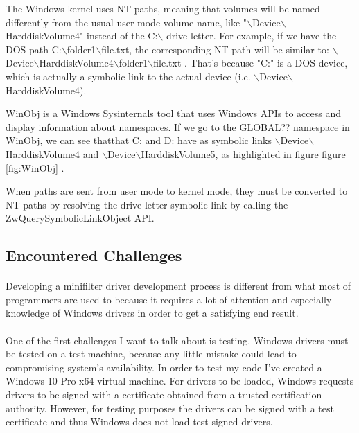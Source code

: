 		The Windows kernel uses NT paths, meaning that volumes will be named differently from the usual user mode volume name, like "$\backslash$Device$\backslash$HarddiskVolume4" instead of the C:$\backslash$ drive letter. For example, if we have the DOS path C:$\backslash$folder1$\backslash$file.txt, the corresponding NT path will be similar to: $\backslash$Device$\backslash$HarddiskVolume4$\backslash$folder1$\backslash$file.txt  \cite{MSDNNamespaces}. That's because "C:" is a DOS device, which is actually a symbolic link to the actual device (i.e. $\backslash$Device$\backslash$HarddiskVolume4).
		
		WinObj is a Windows Sysinternals tool that uses Windows APIs to access and display information about namespaces. If we go to the GLOBAL?? namespace in WinObj, we can see thatthat C: and D: have as symbolic links $\backslash$Device$\backslash$HarddiskVolume4 and $\backslash$Device$\backslash$HarddiskVolume5, as highlighted in figure figure \ref{fig:WinObj} .
		
		When paths are sent from user mode to kernel mode, they must be converted to NT paths by resolving the drive letter symbolic link by calling the ZwQuerySymbolicLinkObject API.
		
		\subsection{Encountered Challenges}
		\paragraph{}
		Developing a minifilter driver development process is different from what most of programmers are used to because it requires a lot of attention and especially knowledge of Windows drivers in order to get a satisfying end result.
		
		\paragraph{}
		One of the first challenges I want to talk about is testing. Windows drivers must be tested on a test machine, because any little mistake could lead to compromising system's availability. In order to test my code I've created a Windows 10 Pro x64 virtual machine. For drivers to be loaded, Windows requests drivers to be signed with a certificate obtained from a trusted certification authority. However, for testing purposes the drivers can be signed with a test certificate and thus Windows does not load test-signed drivers. 
		
